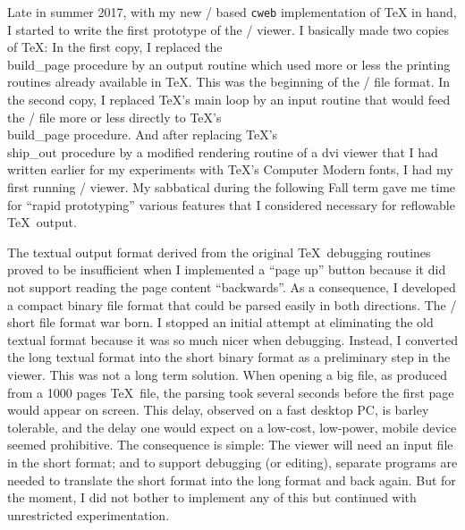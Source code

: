 Late in summer 2017, with my new \CEE/ based {\tt cweb} implementation
of \TeX\cite{Knuth:tex} in hand\cite{MR:webtocweb}\cite{MR:tug38}, I started to write
the first prototype of the \HINT/ viewer. I basically made two copies
of \TeX: In the first copy, I replaced the \\{build\_page} procedure by
an output routine which used more or less the printing routines
already available in \TeX. This was the beginning of the
\HINT/ file format.
In the second copy, I replaced \TeX's main loop by an input routine
that would feed the \HINT/ file more or less directly to \TeX's
\\{build\_page} procedure. And after replacing \TeX's \\{ship\_out}
procedure by a modified rendering routine of a dvi viewer that I had
written earlier for my experiments with \TeX's Computer Modern
fonts\cite{MR:tug37}, I had my first running \HINT/ viewer.  My
sabbatical during the following Fall term gave me time for ``rapid
prototyping'' various features that I considered necessary for
reflowable \TeX\ output\cite{MR:tug39}.

The textual output format derived from the original \TeX\ debugging
routines proved to be insufficient when I implemented a ``page up''
button because it did not support reading the page content
``backwards''. As a consequence, I developed a compact binary file
format that could be parsed easily in both directions. The \HINT/
short file format war born. I stopped an initial attempt at
eliminating the old textual format because it was so much nicer when
debugging. Instead, I converted the long textual format into the short
binary format as a preliminary step in the viewer. This was not a long
term solution.  When opening a big file, as produced from a 1000
pages \TeX\ file, the parsing took several seconds before the first
page would appear on screen. This delay, observed on a fast desktop
PC, is barley tolerable, and the delay one would expect on a low-cost,
low-power, mobile device seemed prohibitive.  The consequence is
simple: The viewer will need an input file in the short format; and to
support debugging (or editing), separate programs are needed to
translate the short format into the long format and back again.  But
for the moment, I did not bother to implement any of this but
continued with unrestricted experimentation.

